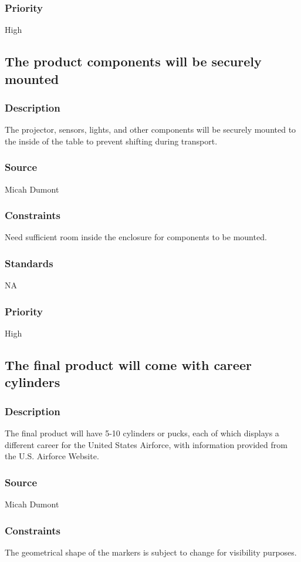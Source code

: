\subsubsection{Priority}
High

\subsection{The product components will be securely mounted}
\subsubsection{Description}
The projector, sensors, lights, and other components will be securely mounted to the inside of the table to prevent shifting during transport.
\subsubsection{Source}
Micah Dumont
\subsubsection{Constraints}
Need sufficient room inside the enclosure for components to be mounted.
\subsubsection{Standards}
NA
\subsubsection{Priority}
High

\subsection{The final product will come with career cylinders}
\subsubsection{Description}
The final product will have 5-10 cylinders or pucks, each of which displays a different career for the United States Airforce, with information provided from the U.S. Airforce Website.
\subsubsection{Source}
Micah Dumont
\subsubsection{Constraints}
The geometrical shape of the markers is subject to change for visibility purposes.
